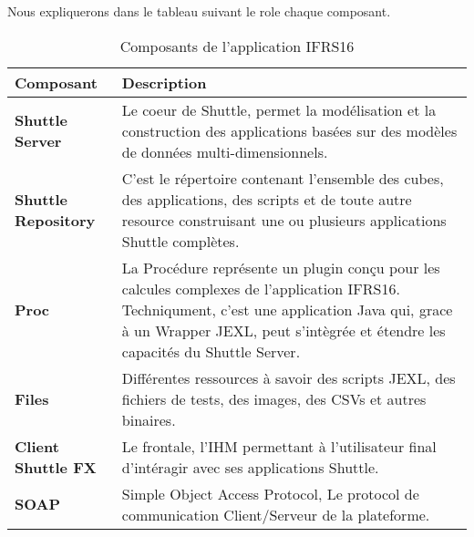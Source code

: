 \begin{spacing}{1.2}
Nous expliquerons dans le tableau suivant le role chaque composant. 
\begin{table}[ht]
	\centering
	\caption{Composants de l'application IFRS16}
	\footnotesize
	\begin{tabularx}{\textwidth}{|p{3.3cm}|X|}
          \hline
          {\textbf{Composant}}
          & 
          {\textbf{Description}} 
          \\
          \hline
          {\textbf{Shuttle Server}} & Le coeur de Shuttle, permet la modélisation et la construction des applications basées sur des modèles de données multi-dimensionnels. \\    \hline
          {\textbf{Shuttle Repository}} & C'est le répertoire contenant l'ensemble des cubes, des applications, des scripts et de toute autre resource construisant une ou plusieurs applications Shuttle complètes.  \\          \hline
          {\textbf{Proc}} & La Procédure représente un plugin conçu pour les calcules complexes de l'application IFRS16. Techniqument, c'est une application Java qui, grace à un Wrapper JEXL, peut s'intègrée et étendre les capacités du Shuttle Server.\\          \hline
          {\textbf{Files}} & Différentes ressources à savoir des scripts JEXL, des fichiers de tests, des images, des CSVs et autres binaires. \\          \hline
          {\textbf{Client Shuttle FX}} & Le frontale, l'IHM permettant à l'utilisateur final d'intéragir avec ses applications Shuttle.\\          \hline
          {\textbf{SOAP}} & Simple Object Access Protocol, Le protocol de communication Client/Serveur de la plateforme. \\          \hline
        \end{tabularx}
	\label{tab:exple}
\end{table}

\end{spacing}
